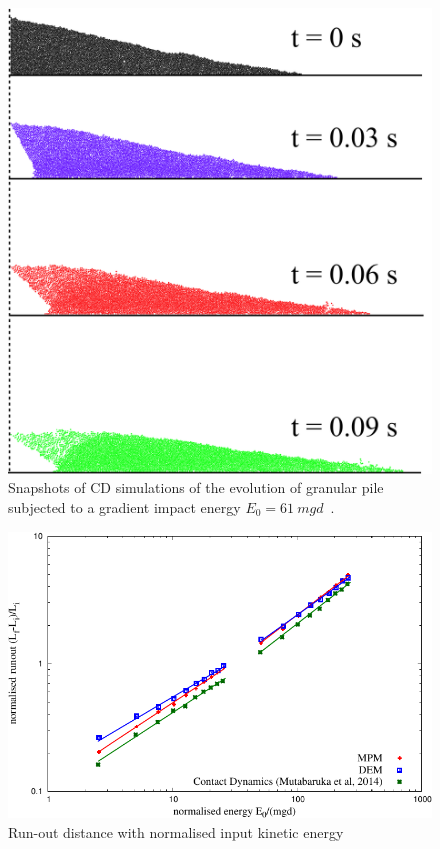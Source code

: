 \begin{figure}[tbph]
\centering
\includegraphics[width=\textwidth]{Gradient_Slope_CD_200J}
\caption{Snapshots of CD simulations of the evolution of granular pile 
subjected to a gradient impact energy $E_0 = 61 \ mgd$~\citep{Mutabaruka2013}.}
\label{fig:Gradient_Slope_CD_200J}
\end{figure}


\begin{figure}[tbph]
\centering
\includegraphics[width=\textwidth]{Runout_Eo_MPM_CD_DEM}
\caption{Run-out distance with normalised input kinetic energy}
\label{fig:Runout_Eo_MPM_CD_DEM}
\end{figure}

